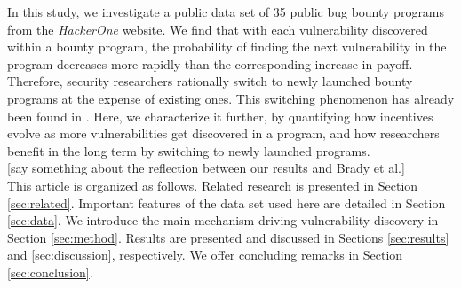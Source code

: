 In this study, we investigate a public data set of 35 public bug bounty programs from the  {\it HackerOne} website. We find that with each vulnerability discovered within a bounty program, the probability of finding the next vulnerability in the program decreases more rapidly than the corresponding increase in payoff. Therefore, security researchers rationally switch to newly launched bounty programs at the expense of existing ones. This switching phenomenon has already been found in \cite{zhao2015empirical}. Here, we characterize it further, by quantifying how incentives evolve as more vulnerabilities get discovered in a program, and how researchers benefit in the long term by switching to newly launched programs.\\

[say something about the reflection between our results and Brady et al.]\\

This article is organized as follows. Related research is presented in Section \ref{sec:related}. Important features of the data set used here are detailed in Section \ref{sec:data}. We introduce the main mechanism driving vulnerability discovery in Section \ref{sec:method}. Results are presented and discussed in Sections \ref{sec:results} and \ref{sec:discussion}, respectively. We offer concluding remarks in Section \ref{sec:conclusion}.

